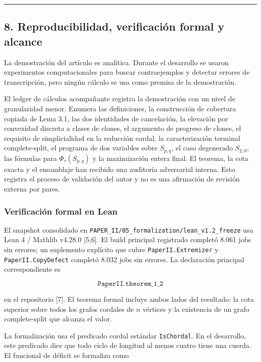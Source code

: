 \documentclass[
  spanish,
  11pt,
  a4paper,
]{article}
\begin{document}
\begin{center}\rule{0.5\linewidth}{0.5pt}\end{center}

\subsection{8. Reproducibilidad, verificación formal y alcance}\label{reproducibilidad-verificaciuxf3n-formal-y-alcance}

La demostración del artículo es analítica. Durante el desarrollo se usaron experimentos computacionales para buscar contraejemplos y detectar errores de transcripción, pero ningún cálculo se usa como premisa de la demostración.

El ledger de cálculos acompañante registra la demostración con un nivel de granularidad menor. Enumera las definiciones, la construcción de cobertura copiada de Lema 3.1, las dos identidades de cancelación, la elevación por convexidad discreta a clases de clones, el argumento de progreso de clones, el requisito de simplicialidad en la reducción cordal, la caracterización terminal complete-split, el programa de dos variables sobre \(S_{p,q}\), el caso degenerado \(S_{2,0}\), las fórmulas para \(\Phi_\tau(S_{p,q})\) y la maximización entera final. El teorema, la cota exacta y el ensamblaje han recibido una auditoría adversarial interna. Esto registra el proceso de validación del autor y no es una afirmación de revisión externa por pares.

\subsubsection{Verificación formal en Lean}\label{verificaciuxf3n-formal-en-lean}

El snapshot consolidado en \texttt{PAPER\_II/05\_formalization/lean\_v1.2\_freeze} usa Lean 4 / Mathlib v4.28.0 {[}5,6{]}. El build principal registrado completó 8.061 jobs sin errores; un suplemento explícito que cubre \texttt{PaperII.Extremizer} y \texttt{PaperII.CopyDefect} completó 8.032 jobs sin errores. La declaración principal correspondiente es

\[
\texttt{PaperII.theorem\_1\_2}
\]

en el repositorio {[}7{]}. El teorema formal incluye ambos lados del resultado: la cota superior sobre todos los grafos cordales de \(n\) vértices y la existencia de un grafo complete-split que alcanza el valor.

La formalización usa el predicado cordal estándar \texttt{IsChordal}. En el desarrollo, este predicado dice que todo ciclo de longitud al menos cuatro tiene una cuerda. El funcional de déficit se formaliza como
\end{document}
